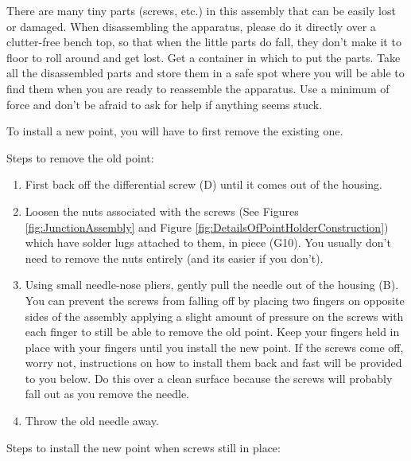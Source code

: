 \documentclass{../lab}
\begin{document}
There are many tiny parts (screws, etc.) in this assembly that can be easily lost or damaged. When disassembling the apparatus, please do it directly over a clutter-free bench top, so that when the little parts do fall, they don't make it to floor to roll around and get lost. Get a container in which to put the parts. Take all the disassembled parts and store them in a safe spot where you will be able to find them when you are ready to reassemble the apparatus. Use a minimum of force and don't be afraid to ask for help if anything seems stuck.

To install a new point, you will have to first remove the existing one.

\noindent Steps to remove the old point:

\begin{enumerate}
    \item First back off the differential screw (D) until it comes out of the housing.

    \item Loosen the nuts associated with the screws (See Figures \ref{fig:JunctionAssembly} and Figure \ref{fig:DetailsOfPointHolderConstruction}) which have solder lugs attached to them, in piece (G10). You usually don't need to remove the nuts entirely (and its easier if you don't).

    \item Using small needle-nose pliers, gently pull the needle out of the housing (B).  You can prevent the screws from falling off by placing two fingers on opposite sides of the assembly applying a slight amount of pressure on the screws with each finger to still be able to remove the old point. Keep your fingers held in place with your fingers until you install the new point. If the screws come off, worry not, instructions on how to install them back and  fast will be provided to you below. Do this over a clean surface because the screws will probably fall out as you remove the needle.

    \item Throw the old needle away.

\end{enumerate}

\noindent Steps to install the new point when screws still in place:
\end{document}
